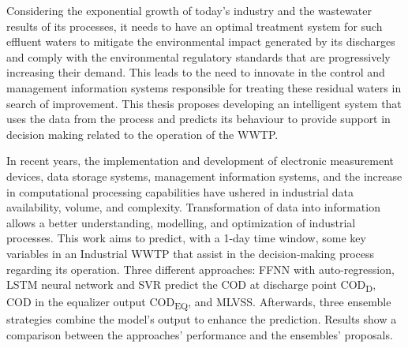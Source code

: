 Considering the exponential growth of today’s industry and the wastewater results of its processes, it needs to have an optimal treatment system for such effluent waters to mitigate the environmental impact generated by its discharges and comply with the environmental regulatory standards that are progressively increasing their demand. This leads to the need to innovate in the control and management information systems responsible for treating these residual waters in search of improvement. This thesis proposes developing an intelligent system that uses the data from the process and predicts its behaviour to provide support in decision making related to the operation of the \ac{WWTP}. %
 
 In recent years, the implementation and development of electronic measurement devices, data storage systems, management information systems, and the increase in computational processing capabilities have ushered in industrial data availability, volume, and complexity. Transformation of data into information allows a better understanding, modelling, and optimization of industrial processes. This work aims to predict, with a 1-day time window, some key variables in an Industrial \ac{WWTP} that assist in the decision-making process regarding its operation. Three different approaches: \ac{FFNN} with auto-regression, \ac{LSTM} neural network and \ac{SVR} predict the \ac{COD} at discharge point \ac{COD}\textsubscript{D}, COD in the equalizer output \ac{COD}\textsubscript{EQ}, and \ac{MLVSS}. Afterwards, three ensemble strategies combine the model’s output to enhance the prediction. Results show a comparison between the approaches’ performance and the ensembles’ proposals.


